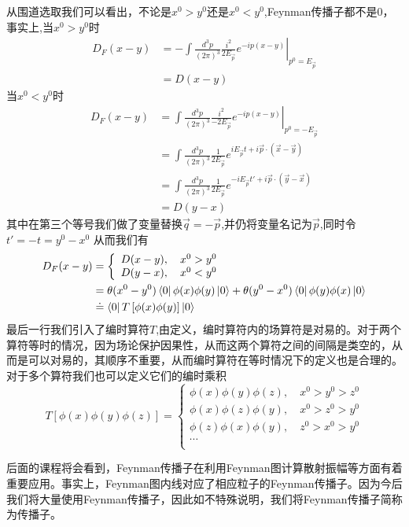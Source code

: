 从围道选取我们可以看出，不论是$x^{0}>y^{0}$还是$x^{0}<y^{0}$,Feynman传播子都不是0，事实上,当$x^{0}>y^{0}$时
\begin{equation}
    \begin{aligned}
     D_{F}(x-y)&=-\int \frac{d^{3}p}{(2\pi)^{3}}\left.\frac{i^{2}}{2E_{\vec{p}}}e^{-ip(x-y)}\right|_{p^{0}=E_{\vec{p}}}\\
     &=D(x-y)
    \end{aligned}
\end{equation}
当$x^{0}<y^{0}$时
\begin{equation}
    \begin{aligned}
     D_{F}(x-y)&=\int \frac{d^{3}p}{(2\pi)^{3}}\left.\frac{i^{2}}{-2E_{\vec{p}}}e^{-ip(x-y)}\right|_{p^{0}=-E_{\vec{p}}}\\
     &=\int \frac{d^{3}p}{(2\pi)^{3}}\frac{1}{2E_{\vec{p}}}e^{iE_{\vec{p}}t+i\vec{p}\cdot(\vec{x}-\vec{y})}\\
      &=\int \frac{d^{3}p}{(2\pi)^{3}}\frac{1}{2E_{\vec{p}}}e^{-iE_{\vec{p}}t'+i\vec{p}\cdot(\vec{y}-\vec{x})}\\
     &=D(y-x)
    \end{aligned}
    \end{equation}
    其中在第三个等号我们做了变量替换$\vec{q}=-\vec{p}$,并仍将变量名记为$\vec{p}$,同时令$t'=-t=y^{0}-x^{0}$
从而我们有
\begin{equation}
    \begin{aligned}
     D_{F}(x-y)&=\left\{
     \begin{array}{cc}
         D(x-y),\quad x^{0}>y^{0}  \\
          D(y-x),\quad x^{0}<y^{0} \\
     \end{array}
          \right.\\
          &=\theta(x^{0}-y^{0})\bra{0}\phi(x)\phi(y)\ket{0}+\theta(y^{0}-x^{0})\bra{0}\phi(y)\phi(x)\ket{0}\\
          &\doteq\bra{0}T\left[\phi(x)\phi(y)\right]\ket{0}
    \end{aligned}
\end{equation}
最后一行我们引入了编时算符$T$,由定义，编时算符内的场算符是对易的。对于两个算符等时的情况，因为场论保护因果性，从而这两个算符之间的间隔是类空的，从而是可以对易的，其顺序不重要，从而编时算符在等时情况下的定义也是合理的。
对于多个算符我们也可以定义它们的编时乘积
\begin{equation}
    T\left[\phi(x)\phi(y)\phi(z)\right]=\left\{
 \begin{array}{c}
      \phi(x)\phi(y)\phi(z),\quad x^{0}>y^{0}>z^{0}  \\
      \phi(x)\phi(z)\phi(y),\quad x^{0}>z^{0}>y^{0}  \\
       \phi(z)\phi(x)\phi(y),\quad z^{0}>x^{0}>y^{0} \\
       \cdots \\
 \end{array}
    \right.
\end{equation}

后面的课程将会看到，Feynman传播子在利用Feynman图计算散射振幅等方面有着重要应用。事实上，Feynman图内线对应了相应粒子的Feynman传播子。因为今后我们将大量使用Feynman传播子，因此如不特殊说明，我们将Feynman传播子简称为传播子。

